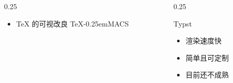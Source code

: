 \begin{frame}
\begin{columns}[t]
\begin{column}{0.25\textwidth}
{\begin{block}{}
\begin{itemize}
            \item[\faAsterisk] \TeX{} 的可视改良 \TeX{}\raise-0.25em\hbox{\footnotesize MACS}  

          \end{itemize}

        \end{block}

      }

    \end{column}

    \begin{column}{0.25\textwidth}

      \begin{exampleblock}{Typst}

        \begin{itemize}

          \item[\faPlus] 渲染速度快

          \item[\faPlus] 简单且可定制

          \item[\faMinus] 目前还不成熟

        \end{itemize}

      \end{exampleblock}


    \end{column}

  \end{columns}



\end{frame}
